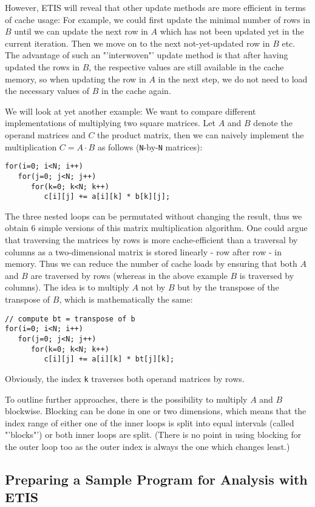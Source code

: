 However, ETIS will reveal that other update methods are more efficient in terms of cache usage: For example, we could first update the minimal number of rows in $B$ until we can update the next row in $A$ which has not been updated yet in the current iteration. Then we move on to the next not-yet-updated row in $B$ etc. The advantage of such an "'interwoven"' update method is that after having updated the rows in $B$, the respective values are still available in the cache memory, so when updating the row in $A$ in the next step, we do not need to load the necessary values of $B$ in the cache again.

We will look at yet another example: We want to compare different implementations of multiplying two square matrices. Let $A$ and $B$ denote the operand matrices and $C$ the product matrix, then we can naively implement the multiplication $C=A \cdot B$ as follows (\texttt{N}-by-\texttt{N} matrices):
\begin{lstlisting}
for(i=0; i<N; i++)
   for(j=0; j<N; j++)
      for(k=0; k<N; k++)
         c[i][j] += a[i][k] * b[k][j];
\end{lstlisting}
The three nested loops can be permutated without changing the result, thus we obtain 6 simple versions of this matrix multiplication algorithm. One could argue that traversing the matrices by rows is more cache-efficient than a traversal by columns as a two-dimensional matrix is stored linearly - row after row - in memory. Thus we can reduce the number of cache loads by ensuring that both $A$ and $B$ are traversed by rows (whereas in the above example $B$ is traversed by columns). The idea is to multiply $A$ not by $B$ but by the transpose of the transpose of $B$, which is mathematically the same:
\begin{lstlisting}
// compute bt = transpose of b
for(i=0; i<N; i++)
   for(j=0; j<N; j++)
      for(k=0; k<N; k++)
         c[i][j] += a[i][k] * bt[j][k];
\end{lstlisting}
Obviously, the index \texttt{k} traverses both operand matrices by rows.

To outline further approaches, there is the possibility to multiply $A$ and $B$ blockwise. Blocking can be done in one or two dimensions, which means that the index range of either one of the inner loops is split into equal intervals (called "'blocks"') or both inner loops are split. (There is no point in using blocking for the outer loop too as the outer index is always the one which changes least.)


\subsection{Preparing a Sample Program for Analysis with ETIS}

